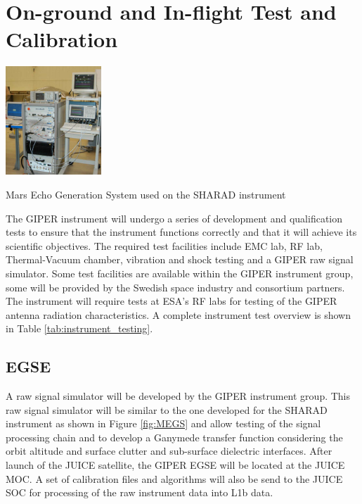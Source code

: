 \section{On-ground and In-flight Test and Calibration}
%
\begin{floatingfigure}[r]{0.3\textwidth}
\centering
\includegraphics[width=0.27\textwidth]{Figures/MEGS}
\caption[caption]{Mars Echo Generation System used on the SHARAD instrument\cite{MEGS}}
\label{fig:MEGS}
\end{floatingfigure}
%
The \ac{GIPER} instrument will undergo a series of development and qualification tests to ensure that the instrument functions correctly and that it will achieve its scientific objectives. 
%
%
The required test facilities include \ac{EMC} lab, RF lab, Thermal-Vacuum chamber, vibration and shock testing and a \ac{GIPER} raw signal simulator. Some test facilities are available within the \ac{GIPER} instrument group, some will be provided by the Swedish space industry and consortium partners. The instrument will require tests at ESA's \ac{RF} labs for testing of the \ac{GIPER} antenna radiation characteristics. A complete instrument test overview is shown in Table \ref{tab:instrument_testing}.
%
\vspace{15mm}
%
\subsection{EGSE}
A raw signal simulator will be developed by the \ac{GIPER} instrument group. This raw signal simulator will be similar to the one developed for the \ac{SHARAD} instrument\cite{Giovanni} as shown in Figure \ref{fig:MEGS} and allow testing of the signal processing chain and to develop a Ganymede transfer function considering the orbit altitude and surface clutter and sub-surface dielectric interfaces. After launch of the JUICE satellite, the \ac{GIPER} \ac{EGSE} will be located at the JUICE \ac{MOC}. A set of calibration files and algorithms will also be send to the JUICE \ac{SOC} for processing of the raw instrument data into L1b data.
%
%
